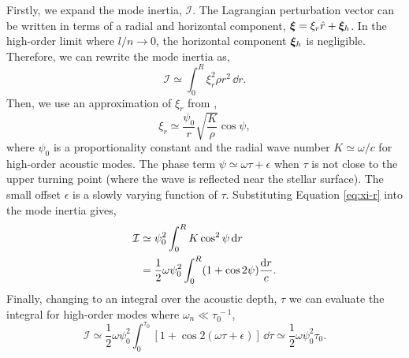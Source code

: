 Firstly, we expand the mode inertia, \(\mathcal{I}\). The Lagrangian perturbation vector can be written in terms of a radial and horizontal component, \(\bm{\xi} = \xi_r \hat{r} + \bm{\xi}_h\). In the high-order limit where \(l/n \rightarrow 0\), the horizontal component \(\bm{\xi}_h\) is negligible. Therefore, we can rewrite the mode inertia as,
%
\begin{equation}
    \mathcal{I} \simeq \int_0^R \xi_r^2 \rho r^2 \, \dd r.
\end{equation}
%
Then, we use an approximation of \(\xi_r\) from \citet{Gough1993}, 
%
\begin{equation}
    \xi_r \simeq \frac{\psi_0}{r}\sqrt{\frac{K}{\rho}} \cos\psi,\label{eq:xi-r}
\end{equation}
%
where \(\psi_0\) is a proportionality constant and the radial wave number \(K \simeq \omega / c\) for high-order acoustic modes. The phase term \(\psi \simeq \omega \tau + \epsilon\) when \(\tau\) is not close to the upper turning point (where the wave is reflected near the stellar surface). The small offset \(\epsilon\) is a slowly varying function of \(\tau\). Substituting Equation \ref{eq:xi-r} into the mode inertia gives,
%
\begin{align}
    \mathcal{I} &\simeq \psi_0^2 \int_0^R K \cos^2\psi \, \mathrm{d} r \notag \\
    &= \frac12 \omega \psi_0^2 \int_0^R (1 + \cos 2 \psi) \frac{\mathrm{d} r}{c}.
\end{align}
%
Finally, changing to an integral over the acoustic depth, \(\tau\) we can evaluate the integral for high-order modes where \(\omega_n \ll \tau_0^{\,-1}\),
%
\begin{equation}
    \mathcal{I} \simeq \frac12 \omega \psi_0^2 \int_0^{\tau_0} [1 + \cos 2 (\omega\tau + \epsilon)] \, \dd \tau \simeq \frac12 \omega \psi_0^2 \tau_0.
\end{equation}
%

